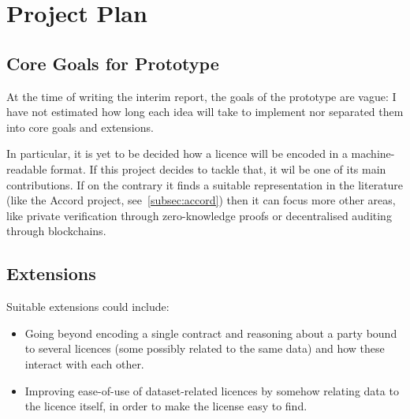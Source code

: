 
\chapter{Project Plan}\label{ch:timeline}



\section{Core Goals for Prototype}\label{sec:core-goals}

At the time of writing the interim report, the goals of the prototype are vague: I have not estimated
how long each idea will take to implement nor separated them into core goals and extensions.

In particular, it is yet to be decided how a licence will be encoded in a machine-readable format.
If this project decides to  tackle that, it wil be one of its main contributions.
If on the contrary it finds a suitable representation in the literature (like the Accord
project, see~\ref{subsec:accord}) then it can focus more other areas, like private verification through
zero-knowledge proofs or decentralised auditing through blockchains.


\section{Extensions}\label{sec:extensions}

Suitable extensions could include:
\begin{itemize}
    \item Going beyond encoding a single contract and reasoning about a party bound to several
    licences (some possibly related to the same data) and how these interact with each other.
    \item Improving ease-of-use of dataset-related licences by somehow relating data to the licence
    itself, in order to make the license easy to find.
\end{itemize}
\newcommand{\foo}{\color{darkgray}\makebox[0pt]{\small\textbullet}\hskip-0.5pt\vrule width 1pt\hspace{\labelsep}}
\newcommand{\bfoo}{\raisebox{2.1ex}[0pt]{\makebox[\dimexpr2\tabcolsep]
{\color{LightSteelBlue3}\tiny\textbullet}}}
\newcommand{\tfoo}{\makebox[\dimexpr2\tabcolsep]{}}%
\daymonth

